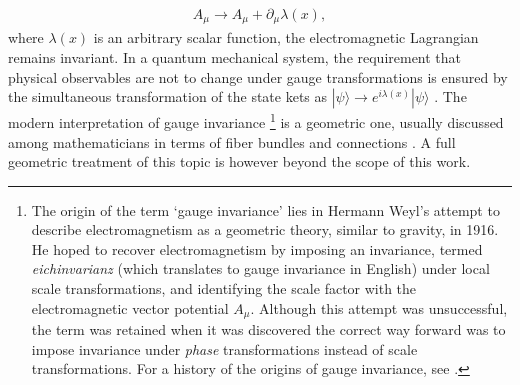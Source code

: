 \begin{align}
  A_\mu\rightarrow A_\mu + \partial_\mu \lambda(x),
  \label{eq:gauge_transformation}
\end{align}
where $\lambda(x)$ is an arbitrary scalar function, the electromagnetic Lagrangian remains invariant. In a quantum mechanical system, the requirement that physical observables are not to change under gauge transformations is ensured by the simultaneous transformation of the state kets as $|\psi\rangle\rightarrow e^{i\lambda(x)}|\psi\rangle$ \citep{Sakurai2010}. The modern interpretation of gauge invariance
\footnote{The origin of the term `gauge invariance' lies in Hermann Weyl's attempt to describe electromagnetism as a geometric theory, similar to gravity, in 1916. He hoped to recover electromagnetism by imposing an invariance, termed \emph{eichinvarianz} (which translates to gauge invariance in English)  under local scale transformations, and identifying the scale factor with the electromagnetic vector potential $A_\mu$. Although this attempt was unsuccessful, the term was retained when it was discovered the correct way forward was to impose invariance under \emph{phase} transformations instead of scale transformations. For a history of the origins of gauge invariance, see \citep{Jackson2001}.}
 is a geometric one, usually discussed among mathematicians in terms of fiber bundles and connections \citep{Cheng1985}. A full geometric treatment of this topic is however beyond the scope of this work.

